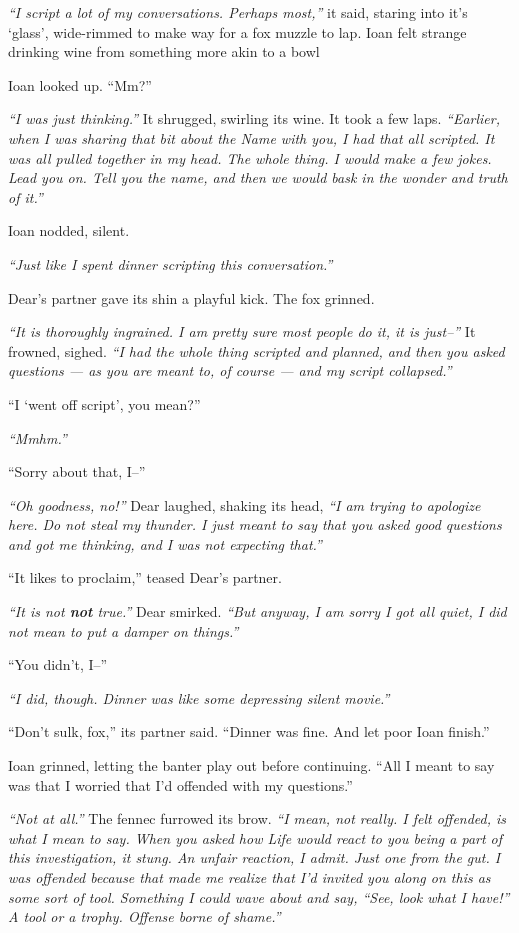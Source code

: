 \emph{``I script a lot of my conversations. Perhaps most,''} it said, staring into it's `glass', wide-rimmed to make way for a fox muzzle to lap. Ioan felt strange drinking wine from something more akin to a bowl

Ioan looked up. ``Mm?''

\emph{``I was just thinking.''} It shrugged, swirling its wine. It took a few laps. \emph{``Earlier, when I was sharing that bit about the Name with you, I had that all scripted. It was all pulled together in my head. The whole thing. I would make a few jokes. Lead you on. Tell you the name, and then we would bask in the wonder and truth of it.''}

Ioan nodded, silent.

\emph{``Just like I spent dinner scripting this conversation.''}

Dear's partner gave its shin a playful kick. The fox grinned.

\emph{``It is thoroughly ingrained. I am pretty sure most people do it, it is just--''} It frowned, sighed. \emph{``I had the whole thing scripted and planned, and then you asked questions — as you are meant to, of course — and my script collapsed.''}

``I `went off script', you mean?''

\emph{``Mmhm.''}

``Sorry about that, I--''

\emph{``Oh goodness, no!''} Dear laughed, shaking its head, \emph{``I am trying to apologize here. Do not steal my thunder. I just meant to say that you asked good questions and got me thinking, and I was not expecting that.''}

``It likes to proclaim,'' teased Dear's partner.

\emph{``It is not \textbf{not} true.''} Dear smirked. \emph{``But anyway, I am sorry I got all quiet, I did not mean to put a damper on things.''}

``You didn't, I--''

\emph{``I did, though. Dinner was like some depressing silent movie.''}

``Don't sulk, fox,'' its partner said. ``Dinner was fine. And let poor Ioan finish.''

Ioan grinned, letting the banter play out before continuing. ``All I meant to say was that I worried that I'd offended with my questions.''

\emph{``Not at all.''} The fennec furrowed its brow. \emph{``I mean, not really. I felt offended, is what I mean to say. When you asked how Life would react to you being a part of this investigation, it stung. An unfair reaction, I admit. Just one from the gut. I was offended because that made me realize that I'd invited you along on this as some sort of tool. Something I could wave about and say, ``See, look what I have!'' A tool or a trophy. Offense borne of shame.''}

